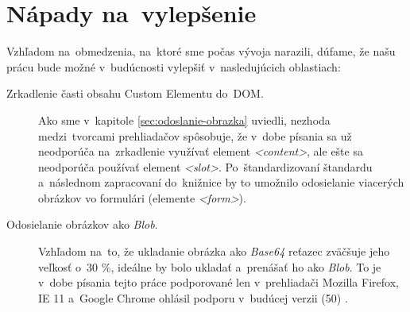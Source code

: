 \section{Nápady na~vylepšenie}

Vzhľadom na~obmedzenia, na~ktoré sme počas vývoja narazili, dúfame, že našu prácu bude možné v~budúcnosti vylepšiť v~nasledujúcich oblastiach:

\begin{description}
	
	\item[Zrkadlenie časti obsahu Custom Elementu do~DOM.] Ako sme v~kapitole \ref{sec:odoslanie-obrazka} uviedli, nezhoda medzi~tvorcami prehliadačov spôsobuje, že v~dobe písania sa už neodporúča na~zrkadlenie využívať element \emph{<content>}, ale ešte sa neodporúča používať element \emph{<slot>}. Po~štandardizovaní štandardu a~následnom zapracovaní do~knižnice by to umožnilo odosielanie viacerých obrázkov vo formulári (elemente \emph{<form>}).
	
	\item[Odosielanie obrázkov ako \emph{Blob}.] Vzhľadom na~to, že ukladanie obrázka ako \emph{Base64} reťazec zväčšuje jeho veľkosť o~30 \%, ideálne by bolo ukladať a~prenášať ho ako \emph{Blob}. To je v~dobe písania tejto práce podporované len v~prehliadači Mozilla Firefox, IE 11 a~Google Chrome ohlásil podporu v~budúcej verzii (50) \cite{Canvas_toBlob}.

\end{description}